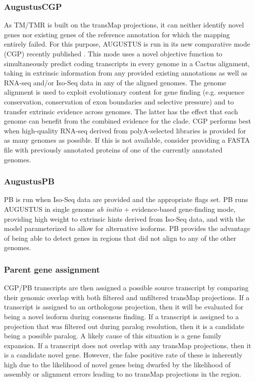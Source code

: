 \documentclass[fleqn,10pt]{wlscirep}
\begin{document}
\subsubsection*{AugustusCGP}
	As TM/TMR is built on the transMap projections, it can neither identify novel genes nor existing genes of the reference annotation for which the mapping entirely failed. For this purpose, AUGUSTUS is run in its new comparative mode (CGP) recently published \cite{konig2015simultaneous}. This mode uses a novel objective function to simultaneously predict coding transcripts in every genome in a Cactus alignment, taking in extrinsic information from any provided existing annotations as well as RNA-seq and/or Iso-Seq data in any of the aligned genomes. The genome alignment is used to exploit evolutionary content for gene finding (e.g. sequence conservation, conservation of exon boundaries and selective pressure) and to transfer extrinsic evidence across genomes. The latter has the effect that each genome can benefit from the combined evidence for the clade. CGP performs best when high-quality RNA-seq derived from polyA-selected libraries is provided for as many genomes as possible. If this is not available, consider providing a FASTA file with previously annotated proteins of one of the currently annotated genomes. 
  
\subsubsection*{AugustusPB}
	PB is run when Iso-Seq data are provided and the appropriate flags set. PB runs AUGUSTUS in single genome \textit{ab initio} + evidence-based gene-finding mode, providing high weight to extrinsic hints derived from Iso-Seq data, and with the model parameterized to allow for alternative isoforms. PB provides the advantage of being able to detect genes in regions that did not align to any of the other genomes.
  
\subsubsection*{Parent gene assignment}
CGP/PB transcripts are then assigned a possible source transcript by comparing their genomic overlap with both filtered and unfiltered transMap projections. If a transcript is assigned to an orthologous projection, then it will be evaluated for being a novel isoform during consensus finding. If a transcript is assigned to a projection that was filtered out during paralog resolution, then it is a candidate being a possible paralog. A likely cause of this situation is a gene family expansion. If a transcript does not overlap with any transMap projections, then it is a candidate novel gene. However, the false positive rate of these is inherently high due to the likelihood of novel genes being dwarfed by the likelihood of assembly or alignment errors leading to no transMap projections in the region.
\end{document}
